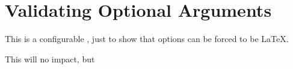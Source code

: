 \documentclass{article}
\begin{document}
\section*{Validating Optional Arguments}


This is a configurable , just to show that options
can be forced to be \LaTeX{}.

This will  no impact, but
\end{document}
